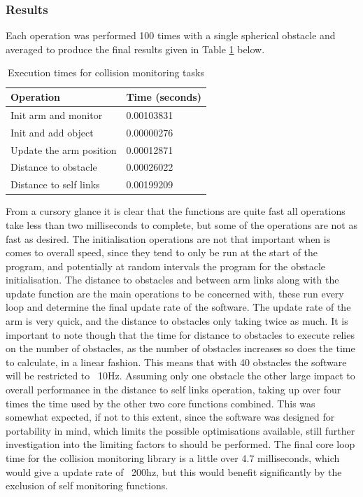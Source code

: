\documentclass[a4paper, 10pt, conference]{ieeeconf}      %
\begin{document}
\subsubsection{Results}
Each operation was performed 100 times with a single spherical obstacle and averaged to produce the final results given in Table \ref{table:Function Times} below.

\begin{table}[H]
	\centering
	\begin{tabular}{|l|l|}
		\hline
		Operation & Time (seconds) \\ \hline
		Init arm and monitor   & 0.00103831     \\ \hline
		Init and add object    & 0.00000276     \\ \hline
		Update the arm position& 0.00012871     \\ \hline
		Distance to obstacle   & 0.00026022     \\ \hline
		Distance to self links & 0.00199209     \\ \hline
	\end{tabular}
	\caption{Execution times for collision monitoring tasks}
	\label{table:Function Times}
\end{table}
From a cursory glance it is clear that the functions are quite fast all operations take less than two milliseconds to complete, but some of the operations are not as fast as desired. The initialisation operations are not that important when is comes to overall speed, since they tend to only be run at the start of the program, and potentially at random intervals the program for the obstacle initialisation. The distance to obstacles and between arm links along with the update function are the main operations to be concerned with, these run every loop and determine the final update rate of the software. The update rate of the arm is very quick, and the distance to obstacles only taking twice as much. It is important to note though that the time for distance to obstacles to execute relies on the number of obstacles, as the number of obstacles increases so does the time to calculate, in a linear fashion. This means that with 40 obstacles the software will be restricted to ~10Hz. Assuming only one obstacle the other large impact to overall performance in the distance to self links operation, taking up over four times the time used by the other two core functions combined. This was somewhat expected, if not to this extent, since the software was designed for portability in mind, which limits the possible optimisations available, still further investigation into the limiting factors to should be performed. The final core loop time for the collision monitoring library is a little over 4.7 milliseconds, which would give a update rate of ~200hz, but this would benefit significantly by the exclusion of self monitoring functions.
\end{document}
